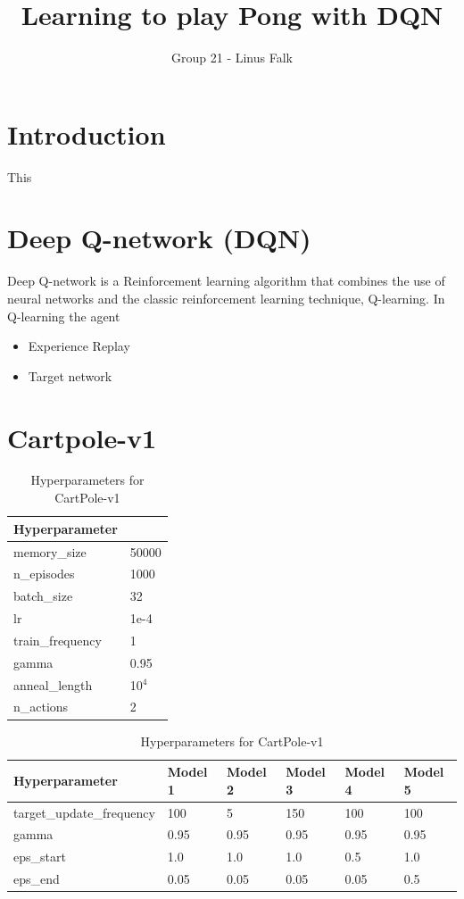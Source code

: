 \documentclass[a4paper,10pt]{article}
\title{Learning to play Pong with DQN}
\author{Group 21 - Linus Falk}
\begin{document}
\maketitle
\section{Introduction}
This 

\section{Deep Q-network (DQN)}
Deep Q-network is a Reinforcement learning algorithm that combines the use of neural networks and the classic reinforcement learning technique, Q-learning. In Q-learning the agent    

\begin{itemize}
	\item Experience Replay
	\item Target network
\end{itemize}


\section{Cartpole-v1}

\begin{table}[ht]
\centering
\begin{tabular}{|l|l|}
\hline
\textbf{Hyperparameter} & \\
\hline
memory\_size & 50000 \\
n\_episodes & 1000 \\
batch\_size & 32  \\
lr & 1e-4 \\
train\_frequency & 1\\
gamma & 0.95  \\
anneal\_length & 10$^4$ \\
n\_actions & 2 \\
\hline
\end{tabular}
\caption{Hyperparameters for CartPole-v1}
\label{tab:cartpole}
\end{table}


\begin{table}[ht]
\centering
\begin{tabular}{|l|l|l|l|l|l|}
\hline
\textbf{Hyperparameter} & \textbf{Model 1} & \textbf{Model 2} & \textbf{Model 3} & \textbf{Model 4} & \textbf{Model 5} \\
\hline
target\_update\_frequency & 100 & 5 & 150 & 100 & 100 \\
gamma & 0.95 & 0.95 & 0.95 & 0.95 & 0.95 \\

eps\_start & 1.0 & 1.0 & 1.0 & 0.5 & 1.0 \\
eps\_end & 0.05 & 0.05 & 0.05 & 0.05 & 0.5 \\
\hline
\end{tabular}
\caption{Hyperparameters for CartPole-v1}
\label{tab:cartpole}
\end{table}
\end{document}
